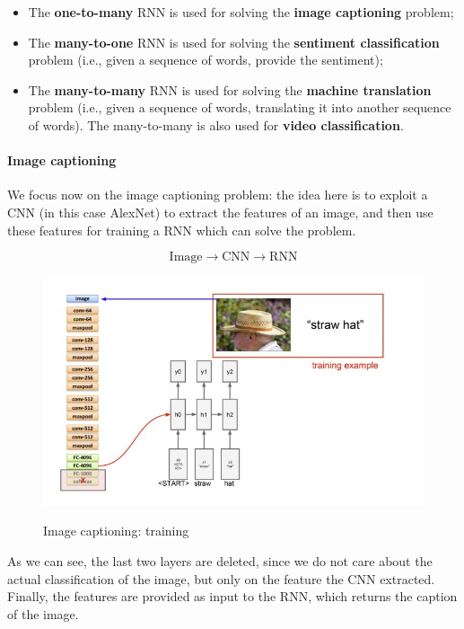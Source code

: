 \begin{itemize}
    \item The \textbf{one-to-many} RNN is used for solving the \textbf{image captioning} problem;
    \item The \textbf{many-to-one} RNN is used for solving the \textbf{sentiment classification} problem (i.e., given a sequence of words, provide the sentiment);
    \item The \textbf{many-to-many} RNN is used for solving the \textbf{machine translation} problem (i.e., given a sequence of words, translating it into another sequence of words). The many-to-many is also used for \textbf{video classification}.
\end{itemize}

\paragraph{Image captioning}
We focus now on the image captioning problem: the idea here is to exploit a CNN (in this case AlexNet) to extract the features of an image, and then use these features for training a RNN which can solve the problem.

$$
\text{Image} \to \text{CNN} \to \text{RNN}
$$

\begin{figure}[h!]
		\centering
        \includegraphics[scale = 1.5]{img/image captioning 1.jpg}
		\label{mi}
        \caption{Image captioning: training}
\end{figure}

As we can see, the last two layers are deleted, since we do not care about the actual classification of the image, but only on the feature the CNN extracted. Finally, the features are provided as input to the RNN, which returns the caption of the image. 


